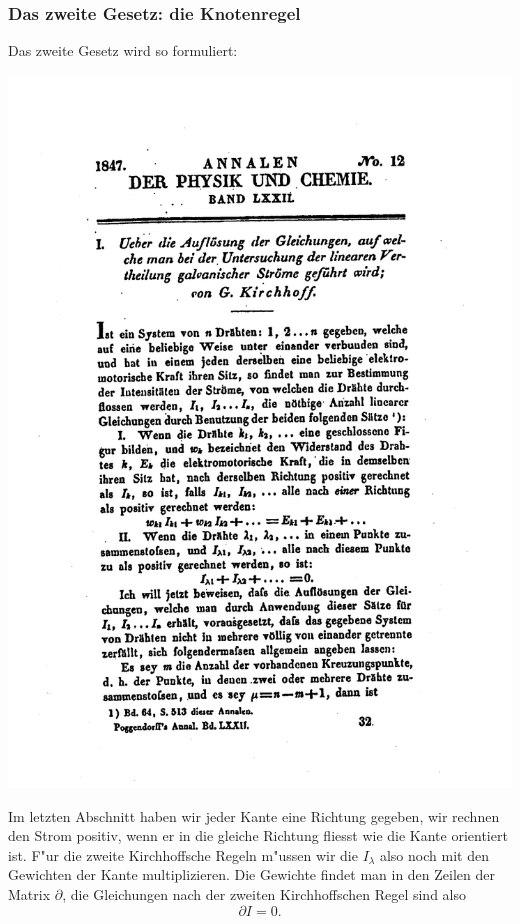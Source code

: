 \subsubsection{Das zweite Gesetz: die Knotenregel}
Das zweite Gesetz wird so formuliert:
\bigskip
\begin{center}
\includegraphics[width=\hsize]{graphics/kh2}
\end{center}
\bigskip
Im letzten Abschnitt haben wir jeder Kante eine Richtung gegeben,
wir rechnen den Strom positiv, wenn er in die gleiche Richtung fliesst
wie die Kante orientiert ist. F"ur die zweite Kirchhoffsche Regeln
m"ussen wir die $I_\lambda$ also noch mit den Gewichten der Kante
multiplizieren. Die Gewichte findet man in den Zeilen der Matrix
$\partial$, die Gleichungen nach der zweiten Kirchhoffschen
Regel sind also
\[
\partial I=0.
\]

